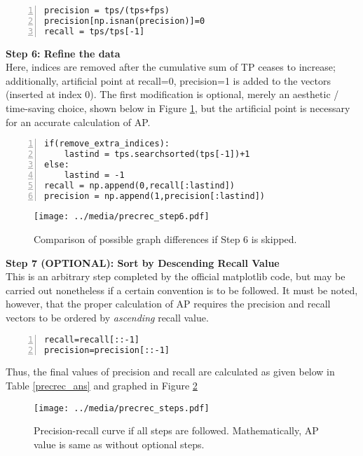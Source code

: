 \begin{lstlisting}[numbers=left]
precision = tps/(tps+fps)
precision[np.isnan(precision)]=0
recall = tps/tps[-1]
\end{lstlisting}


\textbf{{\large Step 6: Refine the data}} \\
Here, indices are removed after the cumulative sum of TP ceases to increase; additionally, artificial point at recall=0, precision=1 is added to the vectors (inserted at index 0). The first modification is optional, merely an aesthetic / time-saving choice, shown below in Figure \ref{precrec_step6}, but the artificial point is necessary for an accurate calculation of AP.

\begin{lstlisting}[numbers=left]
if(remove_extra_indices):
    lastind = tps.searchsorted(tps[-1])+1
else:
    lastind = -1
recall = np.append(0,recall[:lastind])
precision = np.append(1,precision[:lastind])
\end{lstlisting}

\begin{figure}[H]
    \centering
    \texttt{[image: ../media/precrec\_step6.pdf]}
    \caption{Comparison of possible graph differences if Step 6 is skipped.}
    \label{precrec_step6}
\end{figure}

\textbf{{\large Step 7 (OPTIONAL): Sort by Descending Recall Value}} \\
This is an arbitrary step completed by the official matplotlib code, but may be carried out nonetheless if a certain convention is to be followed. It must be noted, however, that the proper calculation of AP requires the precision and recall vectors to be ordered by \textit{ascending} recall value.

\begin{lstlisting}[numbers=left]
recall=recall[::-1]
precision=precision[::-1]
\end{lstlisting}

Thus, the final values of precision and recall are calculated as given below in Table \ref{precrec_ans} and graphed in Figure \ref{precrec_steps}

\begin{figure}[H]
    \centering
    \texttt{[image: ../media/precrec\_steps.pdf]}
    \caption{Precision-recall curve if all steps are followed. Mathematically, AP value is same as without optional steps.}
    \label{precrec_steps}
\end{figure}

